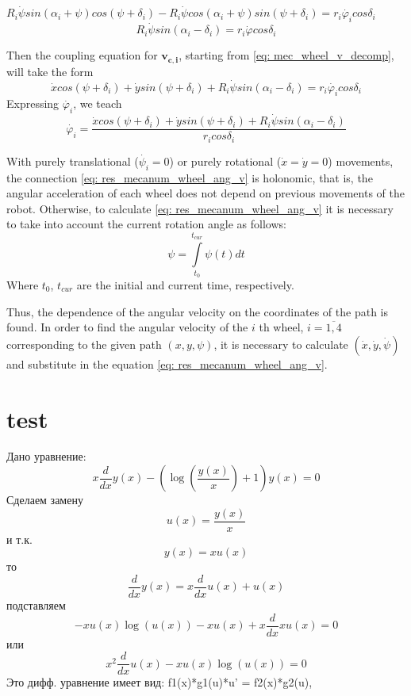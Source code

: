 \documentclass[oneside,final,14pt]{extreport}
\newcommand{\bs}{\boldsymbol}
\begin{document}
$
R_{i}
\dot{\psi}
sin (\alpha_{i} + \psi)
cos (\psi + \delta_{i})
-
R_{i}
\dot{\psi}
cos (\alpha_{i} + \psi)
sin (\psi + \delta_{i})
=
r_{i} \dot{\varphi_{i}}
cos \delta_{i}
$
\begin{equation}
R_{i}
\dot{\psi}
sin (\alpha_{i} - \delta_{i})
=
r_{i}
\dot{\varphi}
cos \delta_{i}
\end{equation}

Then the coupling equation for $ \bs{v_{c, i}} $, starting from \ref{eq: mec_wheel_v_decomp}, will take the form
\begin{equation}
\label{eq: res_mecanum_wheel_car}
\dot{x}
cos (\psi + \delta_{i})
+
\dot{y}
sin (\psi + \delta_{i})
+
R_{i}
\dot{\psi}
sin (\alpha_{i} - \delta_{i})
=
r_{i} \dot{\varphi_{i}}
cos \delta_{i}
\end{equation}
Expressing $ \dot{\varphi_{i}} $, we teach
\begin{equation}
\label{eq: res_mecanum_wheel_ang_v}
\dot{\varphi_{i}}
=
\frac{
\dot{x}
cos (\psi + \delta_{i})
+
\dot{y}
sin (\psi + \delta_{i})
+
R_{i}
\dot{\psi}
sin (\alpha_{i} - \delta_{i})
}
{
r_{i} cos \delta_{i}
}
\end{equation}

With purely translational ($ \dot{\psi_{i}} = 0 $) or purely rotational ($ \dot{x} = \dot{y} = 0 $) movements, the connection \ref{eq: res_mecanum_wheel_ang_v} is holonomic, that is, the angular acceleration of each wheel does not depend on previous movements of the robot. Otherwise, to calculate \ref{eq: res_mecanum_wheel_ang_v} it is necessary to take into account the current rotation angle as follows:
\begin{equation}
\psi
=
\int \limits_{t_{0}} ^{t_{cur}} \psi (t) dt
\end{equation}
Where $ t_{0} $, $ t_{cur} $ are the initial and current time, respectively.

Thus, the dependence of the angular velocity on the coordinates of the path is found. In order to find the angular velocity of the $ i $ th wheel, $ i = \overline{1,4} $ corresponding to the given path $ (x, y, \psi) $, it is necessary to calculate $ (\dot{x}, \dot{y}, \dot{\psi}) $ and substitute in the equation \ref{eq: res_mecanum_wheel_ang_v}.

\chapter{test}
Дано уравнение:
$$x \frac{d}{d x} y{\left(x \right)} - \left(\log{\left(\frac{y{\left(x \right)}}{x} \right)} + 1\right) y{\left(x \right)} = 0$$
Сделаем замену
$$u{\left(x \right)} = \frac{y{\left(x \right)}}{x}$$
и т.к.
$$y{\left(x \right)} = x u{\left(x \right)}$$
то
$$\frac{d}{d x} y{\left(x \right)} = x \frac{d}{d x} u{\left(x \right)} + u{\left(x \right)}$$
подставляем
$$- x u{\left(x \right)} \log{\left(u{\left(x \right)} \right)} - x u{\left(x \right)} + x \frac{d}{d x} x u{\left(x \right)} = 0$$
или
$$x^{2} \frac{d}{d x} u{\left(x \right)} - x u{\left(x \right)} \log{\left(u{\left(x \right)} \right)} = 0$$
Это дифф. уравнение имеет вид:
f1(x)*g1(u)*u' = f2(x)*g2(u),
\end{document}
